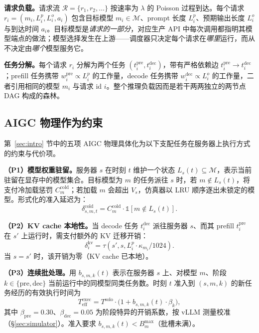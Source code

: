 \textbf{请求负载。}请求流 $\mathcal{R} = \{r_1, r_2, \ldots\}$ 按速率为 $\lambda$ 的 Poisson 过程到达。每个请求 $r_i = (m_i, L^p_i, L^o_i, a_i)$ 包含目标模型 $m_i \in \mathcal{M}$、prompt 长度 $L^p_i$、预期输出长度 $L^o_i$ 与到达时间 $a_i$。目标模型是\emph{请求的一部分}，对应生产 API 中每次调用都指明其模型端点的做法；模型选择发生在上游——调度器只决定每个请求在\emph{哪里}运行，而从不决定由\emph{哪个}模型服务它。

\textbf{任务分解。}每个请求 $r_i$ 分解为两个任务 $(t^{\text{pre}}_i, t^{\text{dec}}_i)$，带有严格依赖边 $t^{\text{pre}}_i \to t^{\text{dec}}_i$；prefill 任务携带 $w^{\text{pre}}_i \propto L^p_i$ 的工作量，decode 任务携带 $w^{\text{dec}}_i \propto L^o_i$ 的工作量，二者引用相同的模型 $m_i$ 与请求 id $i$。整个推理负载因而是若干两两独立的两节点 DAG 构成的森林。

\subsection{AIGC 物理作为约束}
\label{sec:physics-constraints}

第~\ref{sec:intro} 节中的五项 AIGC 物理具体化为以下支配任务在服务器上执行方式的约束与代价项。

\textbf{（P1）模型权重驻留。}服务器 $s$ 在时刻 $t$ 维护一个状态 $L_s(t) \subseteq \mathcal{M}$，表示当前驻留在显存中的模型集合。目标模型为 $m$ 的任务派往 $s$ 时，若 $m \notin L_s(t)$，将支付冷加载惩罚 $C^{\text{cold}}_m$；若加载 $m$ 会超出 $V_s$，仿真器以 LRU 顺序逐出未锁定的模型。形式化的准入延迟为：
\begin{equation}
  \delta^{\text{cold}}_{s,m,t} = C^{\text{cold}}_m \cdot
    \mathbb{1}[m \notin L_s(t)].
\end{equation}

\textbf{（P2）KV cache 本地性。}当 decode 任务 $t^{\text{dec}}_i$ 派往服务器 $s$、而其 prefill $t^{\text{pre}}_i$ 在 $s'$ 上运行时，需支付额外的 KV 迁移开销：
\begin{equation}
  \delta^{\text{kv}}_i = \tau\!\left(s', s,
    L^p_i \cdot \kappa_{m_i} / 1024\right).
\end{equation}
当 $s = s'$ 时，该开销为零（KV cache 已本地）。

\textbf{（P3）连续批处理。}用 $b_{s,m,k}(t)$ 表示在服务器 $s$ 上、对模型 $m$、阶段 $k \in \{\text{pre}, \text{dec}\}$ 当前运行中的同模型同类任务数。时刻 $t$ 准入到 $(s, m, k)$ 的新任务经历的有效执行时间为
\begin{equation}
  T^{\text{exec}}_{\text{eff}}
    = T^{\text{solo}} \cdot
      \bigl(1 + b_{s,m,k}(t) \cdot \beta_k\bigr),
\end{equation}
其中 $\beta_{\text{pre}} = 0.30$、$\beta_{\text{dec}} = 0.05$ 为阶段特异的开销系数，按 vLLM 测量校准（\S\ref{sec:simulator}）。准入要求 $b_{s,m,k}(t) < B^{\max}_m$（批槽未满）。

